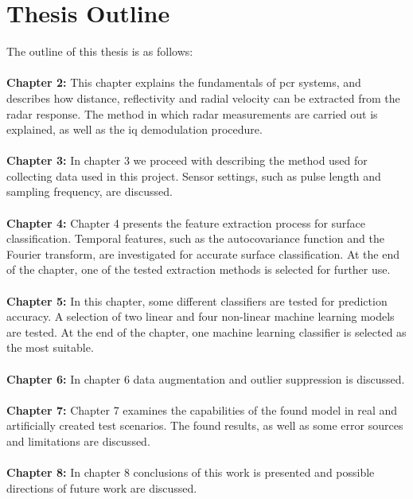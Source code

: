 
\section{Thesis Outline}

The outline of this thesis is as follows:
\\ \\
\noindent\textbf{Chapter 2:} This chapter explains the fundamentals of \gls{pcr} systems, and describes how distance, reflectivity and radial velocity can be extracted from the radar response. The method in which radar measurements are carried out is explained, as well as the \gls{iq} demodulation procedure.
\\ \\
\noindent\textbf{Chapter 3:} In chapter 3 we proceed with describing the method used for collecting data used in this project. Sensor settings, such as pulse length and sampling frequency, are discussed. 
\\ \\
\noindent\textbf{Chapter 4:} Chapter 4 presents the feature extraction process for surface classification. Temporal features, such as the autocovariance function and the Fourier transform, are investigated for accurate surface classification. At the end of the chapter, one of the tested extraction methods is selected for further use. 
\\ \\
\noindent\textbf{Chapter 5:}  In this chapter, some different classifiers are tested for prediction accuracy. A selection of two linear and four non-linear machine learning models are tested. At the end of the chapter, one machine learning classifier is selected as the most suitable. 
\\ \\
\noindent\textbf{Chapter 6:} In chapter 6 data augmentation and outlier suppression is discussed.  
\\ \\
\noindent\textbf{Chapter 7:} Chapter 7 examines the capabilities of the found model in real and artificially created test scenarios. The found results, as well as some error sources and limitations are discussed.
\\ \\
\noindent\textbf{Chapter 8:} In chapter 8 conclusions of this work is presented and possible directions of future work are discussed. 





